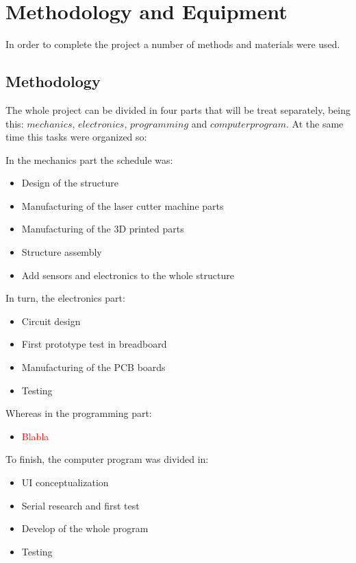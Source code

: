 \chapter{Methodology and Equipment}
\label{chap:methodology}
	In order to complete the project a number of methods and materials were used.

	\section{Methodology}
	\label{sec:methodology}
		The whole project can be divided in four parts that will be treat separately, being this: $mechanics$, $electronics$, $programming$ and $computer program$. At the same time this tasks were organized so:

		In the mechanics part the schedule was:
		\begin{itemize}
			\item Design of the structure
			\item Manufacturing of the laser cutter machine parts
			\item Manufacturing of the 3D printed parts
			\item Structure assembly
			\item Add sensors and electronics to the whole structure
		\end{itemize}

		In turn, the electronics part:
		\begin{itemize}
			\item Circuit design
			\item First prototype test in breadboard
			\item Manufacturing of the PCB boards
			\item Testing
		\end{itemize}

		Whereas in the programming part:
		\begin{itemize}
			\item \textcolor{red}{Blabla}
		\end{itemize}

		To finish, the computer program was divided in:
		\begin{itemize}
			\item UI conceptualization
			\item Serial research and first test
			\item Develop of the whole program
			\item Testing
		\end{itemize}

